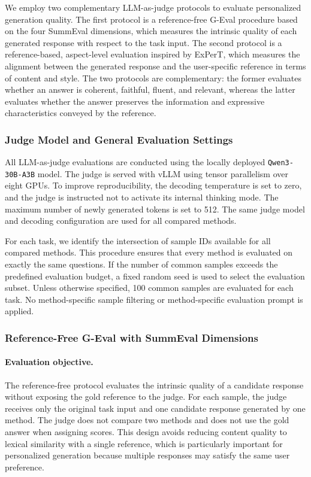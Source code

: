 \documentclass{article} %
\begin{document}
We employ two complementary LLM-as-judge protocols to evaluate personalized generation quality. The first protocol is a reference-free G-Eval procedure based on the four SummEval dimensions, which measures the intrinsic quality of each generated response with respect to the task input. The second protocol is a reference-based, aspect-level evaluation inspired by ExPerT, which measures the alignment between the generated response and the user-specific reference in terms of content and style. The two protocols are complementary: the former evaluates whether an answer is coherent, faithful, fluent, and relevant, whereas the latter evaluates whether the answer preserves the information and expressive characteristics conveyed by the reference.

\subsubsection{Judge Model and General Evaluation Settings}

All LLM-as-judge evaluations are conducted using the locally deployed \texttt{Qwen3-30B-A3B} model. The judge is served with vLLM using tensor parallelism over eight GPUs. To improve reproducibility, the decoding temperature is set to zero, and the judge is instructed not to activate its internal thinking mode. The maximum number of newly generated tokens is set to 512. The same judge model and decoding configuration are used for all compared methods.

For each task, we identify the intersection of sample IDs available for all compared methods. This procedure ensures that every method is evaluated on exactly the same questions. If the number of common samples exceeds the predefined evaluation budget, a fixed random seed is used to select the evaluation subset. Unless otherwise specified, 100 common samples are evaluated for each task. No method-specific sample filtering or method-specific evaluation prompt is applied.

\subsubsection{Reference-Free G-Eval with SummEval Dimensions}

\paragraph{Evaluation objective.}
The reference-free protocol evaluates the intrinsic quality of a candidate response without exposing the gold reference to the judge. For each sample, the judge receives only the original task input and one candidate response generated by one method. The judge does not compare two methods and does not use the gold answer when assigning scores. This design avoids reducing content quality to lexical similarity with a single reference, which is particularly important for personalized generation because multiple responses may satisfy the same user preference.
\end{document}
